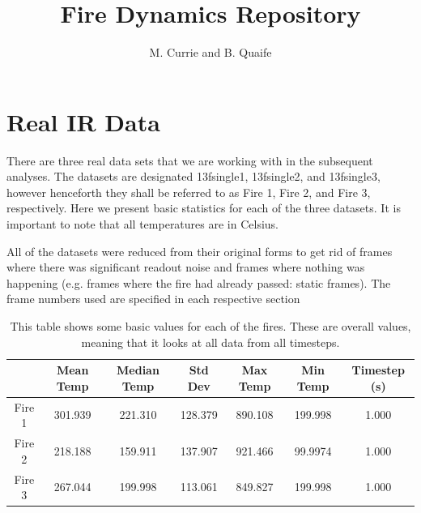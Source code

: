 \documentclass{article}
\begin{document}
\title{Fire Dynamics Repository}
\author{M. Currie and B. Quaife}
\maketitle



\section{Real IR Data}
There are three real data sets that we are working with in the subsequent analyses. 
The datasets are designated 13fsingle1, 13fsingle2, and 13fsingle3, however 
henceforth they shall be referred to as Fire 1, Fire 2, and Fire 3, respectively. Here we 
present basic statistics for each of the three datasets. It is important to note that all 
temperatures are in Celsius.

All of the datasets were reduced from their original forms to get 
rid of frames where there was significant readout noise and frames
where nothing was happening (e.g. frames where the fire had already
passed: static frames). The frame numbers used are specified in each respective section

\begin{table}

\begin{tabular}{|c|c|c|c|c|c|c|}
\hline
 & Mean Temp & Median Temp & Std Dev & Max Temp & Min Temp & Timestep (s) \\
\hline
Fire 1 & 301.939 & 221.310 & 128.379 & 890.108 & 199.998 & 1.000 \\
\hline
Fire 2 & 218.188 & 159.911 & 137.907 & 921.466 & 99.9974 & 1.000 \\
\hline
Fire 3 & 267.044 & 199.998 & 113.061 & 849.827 & 199.998 & 1.000 \\
\hline
\end{tabular}
\centering
\caption{This table shows some basic values for each of the fires. These are overall values, meaning that it looks at all data from all timesteps.}
\end{table}
\end{document}
